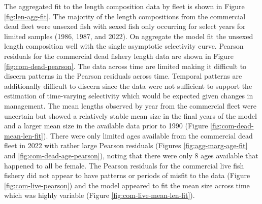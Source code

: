 \documentclass[11pt,
  english,
  letterpaper,
]{article}
\begin{document}
The aggregated fit to the length composition data by fleet is shown in Figure \ref{fig:len-agg-fit}. The majority of the length compositions from the commercial dead fleet were unsexed fish with sexed fish only occurring for select years for limited samples (1986, 1987, and 2022). On aggregate the model fit the unsexed length composition well with the single asymptotic selectivity curve. Pearson residuals for the commercial dead fishery length data are shown in Figure \ref{fig:com-dead-pearson}. The data across time are limited making it difficult to discern patterns in the Pearson residuals across time. Temporal patterns are additionally difficult to discern since the data were not sufficient to support the estimation of time-varying selectivity which would be expected given changes in management. The mean lengths observed by year from the commercial fleet were uncertain but showed a relatively stable mean size in the final years of the model and a larger mean size in the available data prior to 1990 (Figure \ref{fig:com-dead-mean-len-fit}). There were only limited ages available from the commercial dead fleet in 2022 with rather large Pearson residuals (Figures \ref{fig:agg-marg-age-fit} and \ref{fig:com-dead-age-pearson}), noting that there were only 8 ages available that happened to all be female. The Pearson residuals for the commercial live fish fishery did not appear to have patterns or periods of misfit to the data (Figure \ref{fig:com-live-pearson}) and the model appeared to fit the mean size across time which was highly variable (Figure \ref{fig:com-live-mean-len-fit}).
\end{document}
